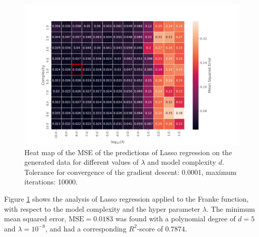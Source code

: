 \begin{figure}[!h]
    \centering
    \includegraphics[scale=0.6]{Figures/LASSO/min_mse_heatmap_ridge_019.pdf}
    \caption{Heat map of the MSE of the predictions of Lasso regression on the generated data for different values of $\lambda$ and model complexity $d$. Tolerance for convergence of the gradient descent: 0.0001, maximum iterations: 10000.}
    \label{fig:lasso_heatmap}
\end{figure}

Figure \ref{fig:lasso_heatmap} shows the analysis of Lasso regression applied to the Franke function, with respect to the model complexity and the hyper parameter $\lambda$. The minimum mean squared error, $\text{MSE} = 0.0183$ was found with a polynomial degree of $d=5$ and $\lambda = 10^{-8}$, and had a corresponding $R^2$-score of $0.7874$.



